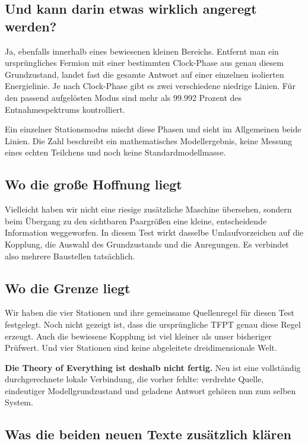 \documentclass[
  ngerman,
  10pt,
  a4paper,
]{article}
\begin{document}
\subsection{Und kann darin etwas wirklich angeregt
werden?}\label{und-kann-darin-etwas-wirklich-angeregt-werden}

Ja, ebenfalls innerhalb eines bewiesenen kleinen Bereichs. Entfernt man
ein ursprüngliches Fermion mit einer bestimmten Clock-Phase aus genau
diesem Grundzustand, landet fast die gesamte Antwort auf einer einzelnen
isolierten Energielinie. Je nach Clock-Phase gibt es zwei verschiedene
niedrige Linien. Für den passend aufgelösten Modus sind mehr als 99.992
Prozent des Entnahmespektrums kontrolliert.

Ein einzelner Stationsmodus mischt diese Phasen und sieht im Allgemeinen
beide Linien. Die Zahl beschreibt ein mathematisches Modellergebnis,
keine Messung eines echten Teilchens und noch keine Standardmodellmasse.

\subsection{Wo die große Hoffnung
liegt}\label{wo-die-grouxdfe-hoffnung-liegt}

Vielleicht haben wir nicht eine riesige zusätzliche Maschine übersehen,
sondern beim Übergang zu den sichtbaren Paargrößen eine kleine,
entscheidende Information weggeworfen. In diesem Test wirkt dasselbe
Umlaufvorzeichen auf die Kopplung, die Auswahl des Grundzustands und die
Anregungen. Es verbindet also mehrere Baustellen tatsächlich.

\subsection{Wo die Grenze liegt}\label{wo-die-grenze-liegt}

Wir haben die vier Stationen und ihre gemeinsame Quellenregel für diesen
Test festgelegt. Noch nicht gezeigt ist, dass die ursprüngliche TFPT
genau diese Regel erzeugt. Auch die bewiesene Kopplung ist viel kleiner
als unser bisheriger Prüfwert. Und vier Stationen sind keine abgeleitete
dreidimensionale Welt.

\textbf{Die Theory of Everything ist deshalb nicht fertig.} Neu ist eine
vollständig durchgerechnete lokale Verbindung, die vorher fehlte:
verdrehte Quelle, eindeutiger Modellgrundzustand und geladene Antwort
gehören nun zum selben System.

\subsection{Was die beiden neuen Texte zusätzlich
klären}\label{was-die-beiden-neuen-texte-zusuxe4tzlich-kluxe4ren}
\end{document}
